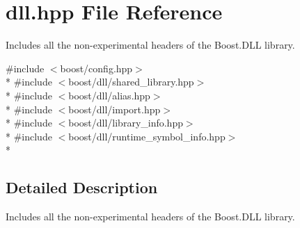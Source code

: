 \hypertarget{a00472}{}\section{dll.\+hpp File Reference}
\label{a00472}


Includes all the non-\/experimental headers of the Boost.\+D\+LL library.  


{\ttfamily \#include $<$boost/config.\+hpp$>$}\\*
{\ttfamily \#include $<$boost/dll/shared\+\_\+library.\+hpp$>$}\\*
{\ttfamily \#include $<$boost/dll/alias.\+hpp$>$}\\*
{\ttfamily \#include $<$boost/dll/import.\+hpp$>$}\\*
{\ttfamily \#include $<$boost/dll/library\+\_\+info.\+hpp$>$}\\*
{\ttfamily \#include $<$boost/dll/runtime\+\_\+symbol\+\_\+info.\+hpp$>$}\\*


\subsection{Detailed Description}
Includes all the non-\/experimental headers of the Boost.\+D\+LL library. 

